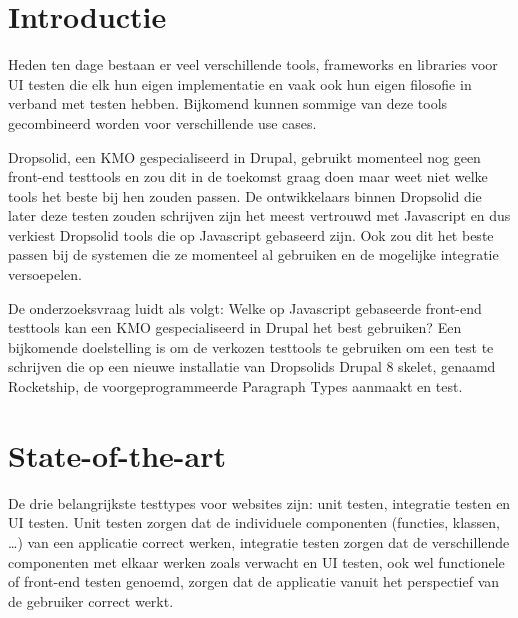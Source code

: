 
\section{Introductie} %
\label{sec:introductie}

Heden ten dage bestaan er veel verschillende tools, frameworks en libraries voor UI testen die elk hun eigen implementatie en vaak ook hun eigen filosofie in verband met testen hebben. Bijkomend kunnen sommige van deze tools gecombineerd worden voor verschillende use cases.

Dropsolid, een KMO gespecialiseerd in Drupal, gebruikt momenteel nog geen front-end testtools en zou dit in de toekomst graag doen maar weet niet welke tools het beste bij hen zouden passen. De ontwikkelaars binnen Dropsolid die later deze testen zouden schrijven zijn het meest vertrouwd met Javascript en dus verkiest Dropsolid tools die op Javascript gebaseerd zijn. Ook zou dit het beste passen bij de systemen die ze momenteel al gebruiken en de mogelijke integratie versoepelen.

De onderzoeksvraag luidt als volgt: Welke op Javascript gebaseerde front-end testtools kan een KMO gespecialiseerd in Drupal het best gebruiken?
Een bijkomende doelstelling is om de verkozen testtools te gebruiken om een test te schrijven die op een nieuwe installatie van Dropsolids Drupal 8 skelet, genaamd Rocketship, de voorgeprogrammeerde Paragraph Types aanmaakt en test.



\section{State-of-the-art}
\label{sec:state-of-the-art}

De drie belangrijkste testtypes voor websites zijn: unit testen, integratie testen en UI testen. Unit testen zorgen dat de individuele componenten (functies, klassen, …) van een applicatie correct werken, integratie testen zorgen dat de verschillende componenten met elkaar werken zoals verwacht en UI testen, ook wel functionele of front-end testen genoemd, zorgen dat de applicatie vanuit het perspectief van de gebruiker correct werkt. \autocite{Elliott2016}

